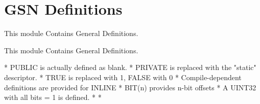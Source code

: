 \hypertarget{a00658}{
\section{GSN Definitions}
\label{a00658}
}


This module Contains General Definitions.  


This module Contains General Definitions. \begin{DoxyVerb}
 * PUBLIC is actually defined as blank.
 * PRIVATE is replaced with the "static" descriptor.
 * TRUE is replaced with 1, FALSE with 0
 * Compile-dependent definitions are provided for INLINE
 * BIT(n) provides n-bit offsets
 * A UINT32 with all bits = 1 is defined.
 *
 *\end{DoxyVerb}
 